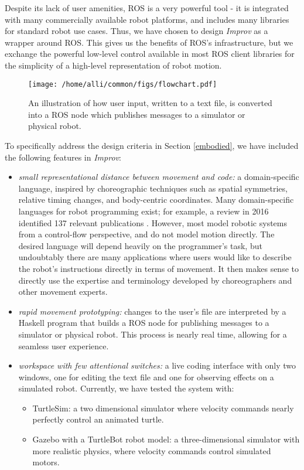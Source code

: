 \documentclass[sigconf]{acmart}
\begin{document}
Despite its lack of user amenities, ROS is a very powerful tool - it is
integrated with many commercially available robot platforms, and includes many
libraries for standard robot use cases. Thus, we have chosen to design
\emph{Improv} as a wrapper around ROS. This gives us the benefits of ROS's
infrastructure, but we exchange the powerful low-level control available in
most ROS client libraries for the simplicity of a high-level representation of
robot motion.

\begin{figure}[t]
\centering
\texttt{[image: /home/alli/common/figs/flowchart.pdf]}
\caption{An illustration of how user input, written to a text file, is
converted into a ROS node which publishes messages to a simulator or physical 
robot.
\label{flowchart}}
\end{figure}

To specifically address the design criteria in Section \ref{embodied}, we have
included the following features in \emph{Improv}:

\begin{itemize}
\item \emph{small representational distance between
movement and code:} a domain-specific language, inspired by choreographic
techniques such as spatial symmetries, relative timing changes, and body-centric
coordinates. Many domain-specific languages for robot programming exist; for example, a
review in 2016 identified 137 relevant publications 
\cite{nordmann2016survey}. However, most model robotic
systems from a control-flow perspective, and do not model motion directly. The
desired language will depend heavily on the programmer's task, but undoubtably
there are many applications where users would like to describe the robot's
instructions directly in terms of movement. It then makes sense to directly use
the expertise and terminology developed by choreographers and other movement
experts. 
\item 
\emph{rapid movement prototyping:} changes to the user's file are interpreted by a 
Haskell program that builds a ROS node for publishing messages to a
simulator or physical robot. This process is nearly real time, allowing for a
seamless user experience.
\item \emph{workspace with few attentional switches:}
a live coding interface with only two windows, one for editing the text file and
one for observing effects on a simulated robot. Currently, we have tested the
system with:
\begin{itemize}
  \item
    TurtleSim: a two dimensional simulator where
    velocity commands nearly perfectly control an animated turtle.
  \item
    Gazebo with a TurtleBot robot model: a three-dimensional simulator
    with more realistic physics, where velocity commands control
    simulated motors.
  \end{itemize}
\end{itemize}
\end{document}
